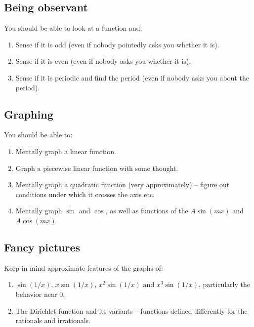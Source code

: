 \documentclass[10pt]{amsart}
\begin{document}
\subsection{Being observant}

You should be able to look at a function and:

\begin{enumerate}
\item Sense if it is odd (even if nobody pointedly asks you whether it
  is).
\item Sense if it is even (even if nobody asks you whether it is).
\item Sense if it is periodic and find the period (even if nobody asks
  you about the period).
\end{enumerate}

\subsection{Graphing}

You should be able to:

\begin{enumerate}
\item Mentally graph a linear function.
\item Graph a piecewise linear function with some thought.
\item Mentally graph a quadratic function (very approximately) --
  figure out conditions under which it crosses the axis etc.
\item Mentally graph $\sin$ and $\cos$, as well as functions of the $A
  \sin(mx)$ and $A\cos(mx)$.
\end{enumerate}

\subsection{Fancy pictures}

Keep in mind approximate features of the graphs of:

\begin{enumerate}
\item $\sin(1/x)$, $x\sin(1/x)$, $x^2 \sin(1/x)$ and $x^3\sin(1/x)$,
  particularly the behavior near $0$.
\item The Dirichlet function and its variants -- functions defined
  differently for the rationals and irrationals.
\end{enumerate}
\end{document}
